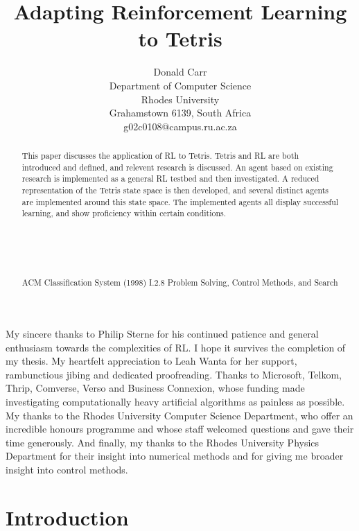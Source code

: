 \documentclass{rucsthesis}
\title{Adapting Reinforcement Learning to Tetris}
\author{Donald Carr \\ Department of Computer Science \\ Rhodes University \\ Grahamstown 6139, South Africa \\ g02c0108@campus.ru.ac.za}
\begin{document}
\maketitle

\begin{abstract}

This paper discusses the application of RL to Tetris. Tetris and RL are both introduced and defined, and relevent research is discussed. An agent based on existing research is implemented as a general RL testbed and then investigated. A reduced representation of the Tetris state space is then developed, and several distinct agents are implemented around this state space. The implemented agents all display successful learning, and show proficiency within certain conditions.\\
\\
\\
\\
\\
\\
ACM Classification System (1998) I.2.8 Problem Solving, Control Methods, and Search

\end{abstract}

\begin{acknowledgements}

My sincere thanks to Philip Sterne for his continued patience and general enthusiasm towards the complexities of RL. I hope it survives the completion of my thesis. My heartfelt appreciation to Leah Wanta for her support, rambunctious jibing and dedicated proofreading. Thanks to Microsoft, Telkom, Thrip, Comverse, Verso and Business Connexion, whose funding made investigating computationally heavy artificial algorithms as painless as possible. My thanks to the Rhodes University Computer Science Department, who offer an incredible honours programme and whose staff welcomed questions and gave their time generously. And finally, my thanks to the Rhodes University Physics Department for their insight into numerical methods and for giving me broader insight into control methods.

\end{acknowledgements}

\tableofcontents
\pagebreak
\listoffigures
\pagebreak
\listoftables
\pagebreak

\chapter{Introduction}
\end{document}
